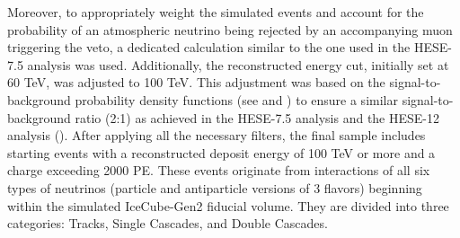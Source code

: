 Moreover, to appropriately weight the simulated events and account for the probability of an atmospheric neutrino being rejected by an accompanying muon triggering the veto, a dedicated calculation similar to the one used in the HESE-7.5 analysis  was used. Additionally, the reconstructed energy cut, initially set at 60 TeV, was adjusted to 100 TeV. This adjustment was based on the signal-to-background probability density functions (see  and ) to ensure a similar signal-to-background ratio (2:1) as achieved in the HESE-7.5 analysis  and the HESE-12 analysis (). After applying all the necessary filters, the final sample includes starting events with a reconstructed deposit energy of 100 TeV or more and a charge exceeding 2000 PE. These events originate from interactions of all six types of neutrinos (particle and antiparticle versions of 3 flavors) beginning within the simulated IceCube-Gen2 fiducial volume. They are divided into three categories: Tracks, Single Cascades, and Double Cascades.

